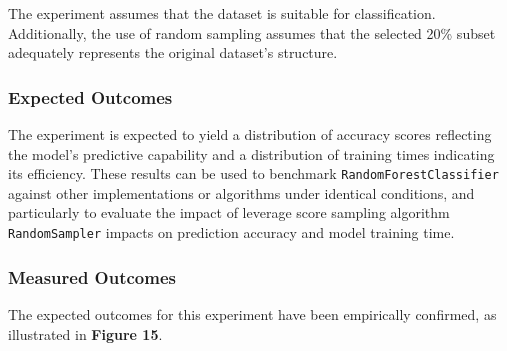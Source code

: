 \documentclass{article}
\theoremstyle{plain}
\theoremstyle{definition}
\theoremstyle{remark}
\begin{document}
The experiment assumes that the dataset is suitable for classification. Additionally, the use of random sampling assumes that the selected 20\% subset adequately represents the original dataset's structure.

\subsubsection{Expected Outcomes}

The experiment is expected to yield a distribution of accuracy scores reflecting the model's predictive capability and a distribution of training times indicating its efficiency. These results can be used to benchmark \texttt{RandomForestClassifier} against other implementations or algorithms under identical conditions, and particularly to evaluate the impact of leverage score sampling algorithm \texttt{RandomSampler} impacts on prediction accuracy and model training time.

\subsubsection{Measured Outcomes}

The expected outcomes for this experiment have been empirically confirmed, as illustrated in \textbf{Figure 15}.


\end{document}
